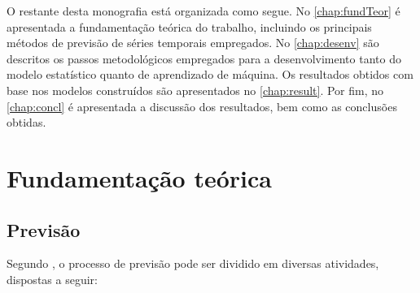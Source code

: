 \documentclass[
    12pt,
    oneside,
    a4paper,
    english,
    brazil
]{abntex2}
\begin{document}
O    restante   desta    monografia    está   organizada    como   segue.    No
\autoref{chap:fundTeor}  é apresentada  a  fundamentação  teórica do  trabalho,
incluindo os principais métodos de  previsão de séries temporais empregados. No
\autoref{chap:desenv} são  descritos os passos metodológicos  empregados para a
desenvolvimento tanto do  modelo estatístico quanto de  aprendizado de máquina.
Os  resultados obtidos  com base  nos modelos  construídos são  apresentados no
\autoref{chap:result}.
Por fim, no \autoref{chap:concl} é  apresentada a discussão dos resultados, bem
como as conclusões obtidas.

\chapter{Fundamentação teórica}\label{chap:fundTeor}

\section{Previsão}
Segundo  ,  o  processo  de previsão  pode  ser  dividido  em
diversas atividades, dispostas a seguir:
\end{document}
